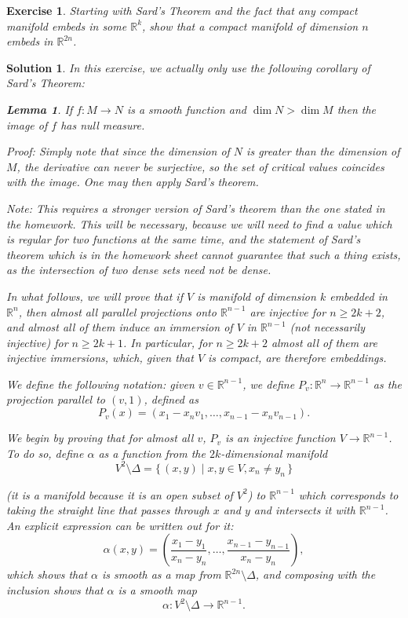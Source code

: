 \documentclass{article}
\newtheorem{ex}{Exercise}
\newtheorem{lemma}{Lemma}
\theoremstyle{nonumberplain}
\newtheorem{sol}{Solution}
\newcommand{\R}{\mathbb{R}}
\begin{document}
\begin{ex}
Starting with Sard's Theorem and the fact that any compact manifold embeds in some $\R^k$, show that a compact manifold of dimension $n$ embeds in $\R^{2n}$.
\end{ex}

\begin{sol}
In this exercise, we actually only use the following corollary of Sard's Theorem:

\begin{lemma}\label{l1}
If $f \colon M \to N$ is a smooth function and $\dim N > \dim M$ then the image of $f$ has null measure.
\end{lemma}

Proof: Simply note that since the dimension of $N$ is greater than the dimension of $M$, the derivative can never be surjective, so the set of critical values coincides with the image. One may then apply Sard's theorem.

Note: This requires a stronger version of Sard's theorem than the one stated in the homework. This will be necessary, because we will need to find a value which is regular for \emph{two} functions at the same time, and the statement of Sard's theorem which is in the homework sheet cannot guarantee that such a thing exists, as the intersection of two dense sets need not be dense.

In what follows, we will prove that if $V$ is manifold of dimension $k$ embedded in $\R^n$, then almost all parallel projections onto $\R^{n-1}$ are injective for $n \geq 2k + 2$, and almost all of them induce an immersion of $V$ in $\R^{n-1}$ (not necessarily injective) for $n \geq 2k+1$. In particular, for $n \geq 2k+2$ almost all of them are injective immersions, which, given that $V$ is compact, are therefore embeddings.

We define the following notation: given $v \in \R^{n-1}$, we define $P_v \colon \R^n \to \R^{n-1}$ as the projection parallel to $(v,1)$, defined as
\[P_v(x) = (x_1 - x_n v_1, \dots, x_{n-1} - x_n v_{n-1}).\]

We begin by proving that for almost all $v$, $P_v$ is an injective function $V \to \R^{n-1}$. To do so, define $\alpha$ as a function from the $2k$-dimensional manifold
\[V^2 \setminus \Delta = \{\,(x,y) \mid x,y \in V, x_n \neq y_n\,\}\]

(it is a manifold because it is an open subset of $V^2$) to $\R^{n-1}$ which corresponds to taking the straight line that passes through $x$ and $y$ and intersects it with $\R^{n-1}$. An explicit expression can be written out for it:
\[\alpha(x,y) = \left(\frac{x_1 - y_1}{x_n - y_n}, \dots, \frac{x_{n-1}-y_{n-1}}{x_n-y_n}\right),\]
which shows that $\alpha$ is smooth as a map from $\R^{2n} \setminus \Delta$, and composing with the inclusion shows that $\alpha$ is a smooth map
\[\alpha \colon V^2 \setminus \Delta \to \R^{n-1}.\]


\end{sol}
\end{document}
